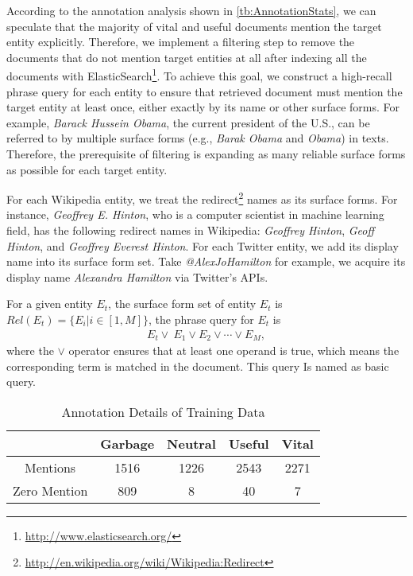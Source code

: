 \documentclass{sig-alternate}
\begin{document}
According to the annotation analysis shown in \autoref{tb:AnnotationStats}, we can speculate that the majority of vital and useful documents mention the target entity explicitly. Therefore, we implement a filtering step to remove the documents that do not mention target entities at all after indexing all the documents with ElasticSearch\footnote{\url{http://www.elasticsearch.org/}}. To achieve this goal, we construct a high-recall phrase query for each entity to ensure that retrieved document must mention the target entity at least once, either exactly by its name or other surface forms. For example, \textit{Barack Hussein Obama}, the current president of the U.S., can be referred to by multiple surface forms (e.g., \textit{Barak Obama} and \textit{Obama}) in texts. Therefore, the prerequisite of filtering is expanding as many reliable surface forms as possible for each target entity.

For each Wikipedia entity, we treat the redirect\footnote{\url{http://en.wikipedia.org/wiki/Wikipedia:Redirect}} names as its surface forms. For instance, \textit{Geoffrey E. Hinton}, who is a computer scientist in machine learning field, has the following redirect names in Wikipedia: \textit{Geoffrey Hinton}, \textit{Geoff Hinton}, and \textit{Geoffrey Everest Hinton}.
For each Twitter entity, we add its display name into its surface form set. Take \textit{@AlexJoHamilton} for example, we acquire its display name \textit{Alexandra Hamilton} via Twitter's APIs.

For a given entity $E_{t}$, the surface form set of entity $E_{t}$ is $Rel(E_{t})=\{E_{i}|i\in[1,M]\}$, the phrase query for $E_{t}$ is
\begin{equation}\label{eq:base}
\begin{split}
 E_{t} \vee \ E_{1} \vee  E_{2} \vee \cdots \vee  E_{M},
\end{split}
\end{equation}
where the $\vee$ operator ensures that at least one operand is true, which means the corresponding term is matched in the document. This query Is named as basic query.

\begin{table}[thbp]
\centering
\caption{Annotation Details of Training Data}\label{tb:AnnotationStats}
\begin{tabular}{ccccc} \hline
 & Garbage & Neutral & Useful & Vital \\ \hline
Mentions & 1516 & 1226 & 2543 & 2271 \\ \hline
Zero Mention & 809 & 8 & 40 & 7 \\ \hline
\end{tabular}
\end{table}
\end{document}
